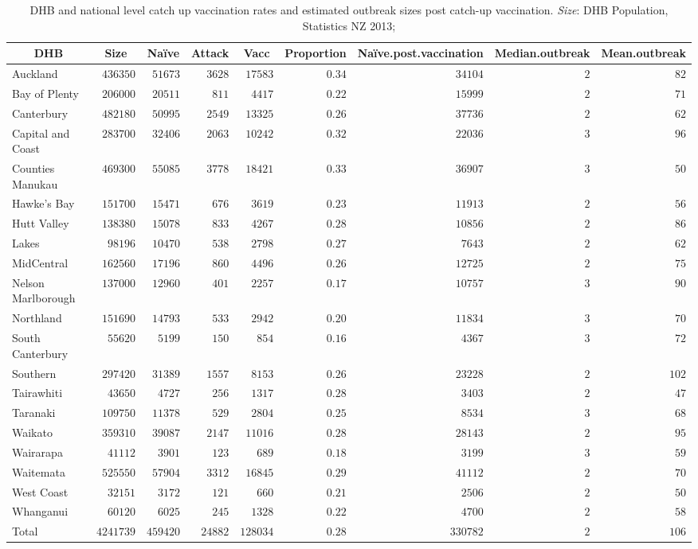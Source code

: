 \documentclass{article}
\begin{document}
\begin{table}\small
\begin{center}
\begin{tabular}{lrrrrrrrr}
\hline\hline
\multicolumn{1}{c}{DHB}&\multicolumn{1}{c}{Size}&\multicolumn{1}{c}{Naïve}&\multicolumn{1}{c}{Attack}&\multicolumn{1}{c}{Vacc}&\multicolumn{1}{c}{Proportion}&\multicolumn{1}{c}{Naïve.post.vaccination}&\multicolumn{1}{c}{Median.outbreak}&\multicolumn{1}{c}{Mean.outbreak}\tabularnewline
\hline
Auckland&$ 436350$&$ 51673$&$ 3628$&$ 17583$&$0.34$&$ 34104$&$2$&$ 82$\tabularnewline
Bay of Plenty&$ 206000$&$ 20511$&$  811$&$  4417$&$0.22$&$ 15999$&$2$&$ 71$\tabularnewline
Canterbury&$ 482180$&$ 50995$&$ 2549$&$ 13325$&$0.26$&$ 37736$&$2$&$ 62$\tabularnewline
Capital and Coast&$ 283700$&$ 32406$&$ 2063$&$ 10242$&$0.32$&$ 22036$&$3$&$ 96$\tabularnewline
Counties Manukau&$ 469300$&$ 55085$&$ 3778$&$ 18421$&$0.33$&$ 36907$&$3$&$ 50$\tabularnewline
Hawke's Bay&$ 151700$&$ 15471$&$  676$&$  3619$&$0.23$&$ 11913$&$2$&$ 56$\tabularnewline
Hutt Valley&$ 138380$&$ 15078$&$  833$&$  4267$&$0.28$&$ 10856$&$2$&$ 86$\tabularnewline
Lakes&$  98196$&$ 10470$&$  538$&$  2798$&$0.27$&$  7643$&$2$&$ 62$\tabularnewline
MidCentral&$ 162560$&$ 17196$&$  860$&$  4496$&$0.26$&$ 12725$&$2$&$ 75$\tabularnewline
Nelson Marlborough&$ 137000$&$ 12960$&$  401$&$  2257$&$0.17$&$ 10757$&$3$&$ 90$\tabularnewline
Northland&$ 151690$&$ 14793$&$  533$&$  2942$&$0.20$&$ 11834$&$3$&$ 70$\tabularnewline
South Canterbury&$  55620$&$  5199$&$  150$&$   854$&$0.16$&$  4367$&$3$&$ 72$\tabularnewline
Southern&$ 297420$&$ 31389$&$ 1557$&$  8153$&$0.26$&$ 23228$&$2$&$102$\tabularnewline
Tairawhiti&$  43650$&$  4727$&$  256$&$  1317$&$0.28$&$  3403$&$2$&$ 47$\tabularnewline
Taranaki&$ 109750$&$ 11378$&$  529$&$  2804$&$0.25$&$  8534$&$3$&$ 68$\tabularnewline
Waikato&$ 359310$&$ 39087$&$ 2147$&$ 11016$&$0.28$&$ 28143$&$2$&$ 95$\tabularnewline
Wairarapa&$  41112$&$  3901$&$  123$&$   689$&$0.18$&$  3199$&$3$&$ 59$\tabularnewline
Waitemata&$ 525550$&$ 57904$&$ 3312$&$ 16845$&$0.29$&$ 41112$&$2$&$ 70$\tabularnewline
West Coast&$  32151$&$  3172$&$  121$&$   660$&$0.21$&$  2506$&$2$&$ 50$\tabularnewline
Whanganui&$  60120$&$  6025$&$  245$&$  1328$&$0.22$&$  4700$&$2$&$ 58$\tabularnewline
Total&$4241739$&$459420$&$24882$&$128034$&$0.28$&$330782$&$2$&$106$\tabularnewline
\hline
\end{tabular}\end{center}\caption{DHB and national level catch up vaccination rates and estimated outbreak sizes post catch-up vaccination. \textit{Size}: DHB Population, Statistics NZ 2013;    
}
\end{table}
\end{document}
